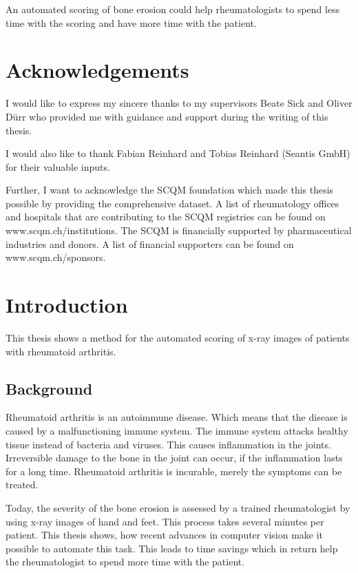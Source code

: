 \documentclass[12pt]{article}
\begin{document}
An automated scoring of bone erosion could help rheumatologists to spend less time with the scoring and have more time with the patient.

\newpage

\section*{Acknowledgements}
I would like to express my sincere thanks to my supervisors Beate Sick and Oliver Dürr who provided me with guidance and support during the writing of this thesis. 

I would also like to thank Fabian Reinhard and Tobias Reinhard (Seantis GmbH) for their valuable inputs. 

Further, I want to acknowledge the SCQM foundation which made this thesis possible by providing the comprehensive dataset. A list of rheumatology offices and hospitals that are contributing to the SCQM registries can be found on www.scqm.ch/institutions. The SCQM is financially supported by pharmaceutical industries and donors. A list of financial supporters can be found on www.scqm.ch/sponsors.

\newpage

\tableofcontents

\newpage

\section{Introduction}

This thesis shows a method for the automated scoring of x-ray images of patients with rheumatoid arthritis.

\subsection{Background}

Rheumatoid arthritis is an autoimmune disease. Which means that the disease is caused by a malfunctioning immune system. The immune system attacks healthy tissue instead of bacteria and viruses. This causes inflammation in the joints. Irreversible damage to the bone in the joint can occur, if the inflammation lasts for a long time. \cite{rheuma} Rheumatoid arthritis is incurable, merely the symptoms can be treated.

Today, the severity of the bone erosion is assessed by a trained rheumatologist by using x-ray images of hand and feet. This process takes several minutes per patient. This thesis shows, how recent advances in computer vision make it possible to automate this task. This leads to time savings which in return help the rheumatologist to spend more time with the patient.
\end{document}
